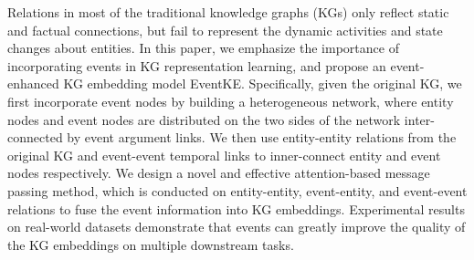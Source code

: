 Relations in most of the traditional knowledge graphs (KGs) only reflect static and factual connections, but fail to represent the dynamic activities and state changes about entities. In this paper, we emphasize the importance of incorporating events in KG representation learning, and propose an event-enhanced KG embedding model EventKE. Specifically, given the original KG, we first incorporate event nodes by building a heterogeneous network, where entity nodes and event nodes are distributed on the two sides of the network inter-connected by event argument links. We then use entity-entity relations from the original KG and event-event temporal links to inner-connect entity and event nodes respectively. We design a novel and effective attention-based message passing method, which is conducted on entity-entity, event-entity, and event-event relations to fuse the event information into KG embeddings. Experimental results on real-world datasets demonstrate that events can greatly improve the quality of the KG embeddings on multiple downstream tasks.
